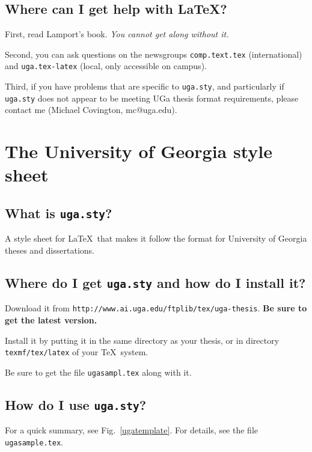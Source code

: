 \documentclass[12pt]{report}
\begin{document}
\subsection{Where can I get help with \LaTeX?}

First, read Lamport's book.  \emph{You cannot get along without it.}

Second, you can ask questions on the newsgroups {\tt comp.text.tex}
(international) and {\tt uga.tex-latex} (local, only accessible on
campus).

Third, if you have problems that are specific to {\tt uga.sty},
and particularly if {\tt uga.sty} does not appear to be meeting
UGa thesis format requirements, please contact me (Michael Covington,
mc@uga.edu).


\section{The University of Georgia style sheet}


\subsection{What is {\tt uga.sty}?}

A style sheet for \LaTeX\ that makes it follow the format for University of Georgia theses
and dissertations.


\subsection{Where do I get {\tt uga.sty} and how do I install it?}

Download it from \texttt{http://www.ai.uga.edu/ftplib/tex/uga-thesis}.
{\bf Be sure to get the latest version.}

Install it by putting it in the
same directory as your thesis, or in directory {\tt texmf/tex/latex} of your \TeX\ system.

Be sure to get the file {\tt ugasampl.tex} along with it.


\subsection{How do I use {\tt uga.sty}?}

For a quick summary, see Fig.\ \ref{ugatemplate}.
For details, see the file {\tt ugasample.tex}.
\end{document}
